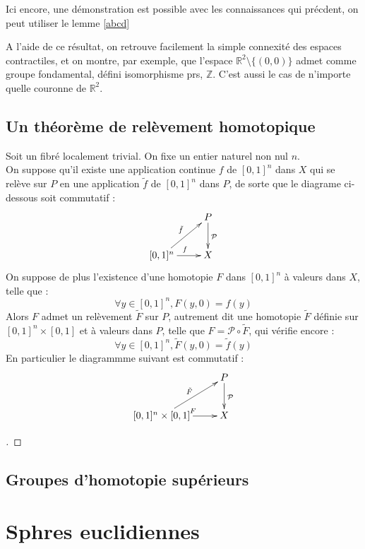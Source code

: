 Ici encore, une d\'emonstration est possible avec les connaissances qui pr\'ecdent, %
on peut utiliser le lemme \ref{abcd}

A l'aide de ce r\'esultat, on retrouve facilement la simple connexit\'e des espaces contractiles, %
et on montre, par exemple, que l'espace $\mathbb{R}^2\setminus\{(0,0)\}$ admet comme groupe fondamental, d\'efini  isomorphisme prs, $\mathbb{Z}$. %
C'est aussi le cas de n'importe quelle couronne de $\mathbb{R}^2$.

\subsection{Un th\'eor\`eme de rel\`evement homotopique}

\begin{theo}
Soit \Fiy un fibr\'e localement trivial.%
On fixe un entier naturel non nul $n$.\\
On suppose qu'il existe une application continue $f$ de $[0,1]^n$ dans $X$ qui se rel\`eve sur $P$ en une application $\tilde{f}$ de $[0,1]^n$ dans $P$, %
de sorte que le diagrame ci-dessous soit commutatif :
\[\xymatrix{ &P \ar[d]^{\mathcal{P}} \\ [0,1]^n \ar[r]^{f} \ar[ru]^{\tilde{f}} & X}\]
On suppose de plus l'existence d'une homotopie $F$ dans $[0,1]^n$ \`a valeurs dans $X$, telle que :
\[\forall y \in [0,1]^n , F(y,0) = f(y)\]
Alors $F$ admet un rel\`evement $\tilde{F}$ sur $P$, autrement dit une homotopie $\tilde{F}$ d\'efinie sur $[0,1]^n \times [0,1]$ et \`a valeurs dans $P$, telle que $F = \mathcal{P} \circ \tilde{F}$, qui v\'erifie encore :
\[\forall y \in [0,1]^n , \tilde{F}(y,0) = \tilde{f}(y)\]
En particulier le diagrammme suivant est commutatif :
\[\xymatrix{ &P \ar[d]^{\mathcal{P}} \\ [0,1]^n \times [0,1] \ar[r]^{F} \ar[ru]^{\tilde{F}} & X}\]
\end{theo}

\begin{proof}[\tr]
\end{proof}

\subsection{Groupes d'homotopie sup\'erieurs}







\section{Sphres euclidiennes}